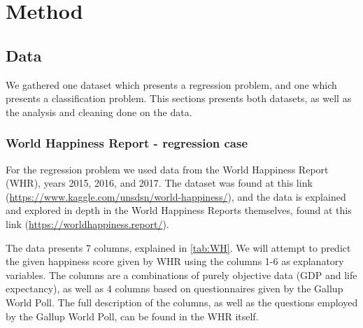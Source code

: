 \documentclass[10pt, twocolumn]{article}
\begin{document}
\section{Method}
\subsection{Data}
We gathered one dataset which presents a regression problem, and one which presents a classification problem. This sections presents both datasets, as well as the analysis and cleaning done on the data.

\subsubsection{World Happiness Report - regression case}
For the regression problem we used data from the World Happiness Report (WHR), years 2015, 2016, and 2017. The dataset was found at this link (\url{https://www.kaggle.com/unsdsn/world-happiness/}), and the data is explained and explored in depth in the World Happiness Reports themselves, found at this link (\url{https://worldhappiness.report/}).

The data presents 7 columns, explained in \cref{tab:WH}. We will attempt to predict the given happiness score given by WHR using the columns 1-6 as explanatory variables. The columns are a combinations of purely objective data (GDP and life expectancy), as well as 4 columns based on questionnaires given by the Gallup World Poll. The full description of the columns, as well as the questions employed by the Gallup World Poll, can be found in the WHR itself.
\end{document}
